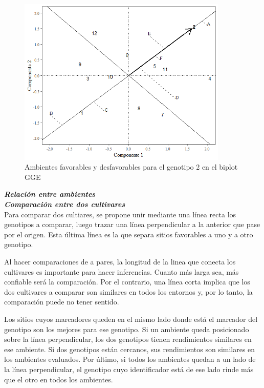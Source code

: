 \begin{figure}[h!]
	\begin{center}
		\includegraphics[width=10cm]{./Graficos/gen_GGE.png}
	\end{center}
	\caption{Ambientes favorables y desfavorables para el genotipo 2 en el biplot GGE}
	\label{fig:fig313}
\end{figure}

\textbf{\emph{Relación entre ambientes}}\\


\textbf{\emph{Comparación entre dos cultivares}}\\

Para comparar dos cultiares, se propone unir mediante una línea recta los genotipos a comparar, luego trazar una línea perpendicular a la anterior que pase por el origen. Esta última línea es la que separa sitios favorables a uno y a otro genotipo.

Al hacer comparaciones de a pares, la longitud de la linea que conecta los cultivares es importante para hacer inferencias. Cuanto más larga sea, más confiable será la comparación. Por el contrario, una línea corta implica que los dos cultivares a comparar son similares en todos los entornos y, por lo tanto, la comparación puede no tener sentido.


Los sitios cuyos marcadores queden en el mismo lado donde está el marcador del genotipo son los mejores para ese genotipo. Si un ambiente queda posicionado sobre la línea perpendicular, los dos genotipos tienen rendimientos similares en ese ambiente. Si dos genotipos están cercanos, sus rendimientos son similares en los ambientes evaluados. Por último, si todos los ambientes quedan a un lado de la línea perpendicular, el genotipo cuyo identificador está de ese lado rinde más que el otro en todos los ambientes.


